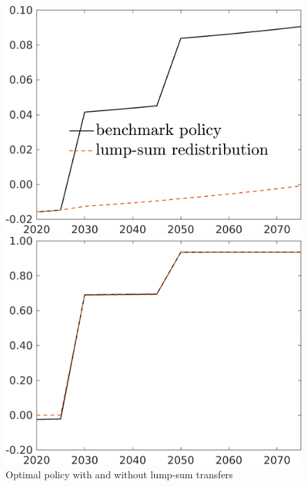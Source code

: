 \begin{figure}[h!!]
	\centering
	\caption{Optimal policy with and without lump-sum transfers}\label{fig:bench_lumpsum_pol}
	
	\begin{minipage}[]{0.32\textwidth}
		\includegraphics[width=1\textwidth]{../../codding_model/own_basedOnFried/optimalPol_190722_tidiedUp/figures/all_July22/comp_notaul4_OPT_T_NoTaus_taul_spillover0_noskill0_sep1_xgrowth0_etaa0.79_lgd1.png}
	\end{minipage}
	\begin{minipage}[]{0.32\textwidth}
		\includegraphics[width=1\textwidth]{../../codding_model/own_basedOnFried/optimalPol_190722_tidiedUp/figures/all_July22/comp_notaul4_OPT_T_NoTaus_tauf_spillover0_noskill0_sep1_xgrowth0_etaa0.79_lgd0.png}

\end{minipage}
\end{figure}
